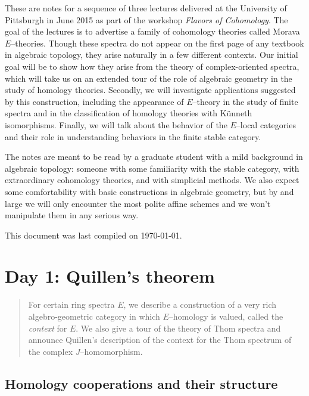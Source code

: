 

\newpage



These are notes for a sequence of three lectures delivered at the University of Pittsburgh in June 2015 as part of the workshop \textit{Flavors of Cohomology}.  The goal of the lectures is to advertise a family of cohomology theories called Morava $E$--theories.  Though these spectra do not appear on the first page of any textbook in algebraic topology, they arise naturally in a few different contexts.  Our initial goal will be to show how they arise from the theory of complex-oriented spectra, which will take us on an extended tour of the role of algebraic geometry in the study of homology theories.  Secondly, we will investigate applications suggested by this construction, including the appearance of $E$--theory in the study of finite spectra and in the classification of homology theories with K\"unneth isomorphisms.  Finally, we will talk about the behavior of the $E$--local categories and their role in understanding behaviors in the finite stable category.

The notes are meant to be read by a graduate student with a mild background in algebraic topology: someone with some familiarity with the stable category, with extraordinary cohomology theories, and with simplicial methods.  We also expect some comfortability with basic constructions in algebraic geometry, but by and large we will only encounter the most polite affine schemes and we won't manipulate them in any serious way.

This document was last compiled on \today.









\newpage
\section{Day 1: Quillen's theorem}

\begin{abstract}
For certain ring spectra $E$, we describe a construction of a very rich algebro-geometric category in which $E$--homology is valued, called the \textit{context} for $E$.  We also give a tour of the theory of Thom spectra and announce Quillen's description of the context for the Thom spectrum of the complex $J$--homomorphism.
\end{abstract}


\subsection{Homology cooperations and their structure}

